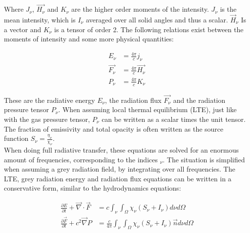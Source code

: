 Where $J_\nu$, $\vec{H_\nu}$ and $K_\nu$ are the higher order moments of the intensity. $J_\nu$ is the mean intensity, which is $I_\nu$ averaged over all solid angles and thus a scalar. $\vec{H}_\nu$ Is a vector and $K_\nu$ is a tensor of order 2. The following relations exist between the moments of intensity and some more physical quantities:

\begin{align}
E_\nu &= \frac{4 \pi}{c} j_\nu \\
\vec{F_\nu} &= \frac{4 \pi}{c} \vec{H_\nu} \\
P_\nu &= \frac{4 \pi}{c} K_\nu
\end{align}

These are the radiative energy $E_\nu$, the radiation flux $\vec{F_\nu}$ and the radiation pressure tensor $P_\nu$. When assuming local thermal equilibrium (LTE), just like with the gas pressure tensor, $P_\nu$ can be written as a scalar times the unit tensor. The fraction of emissivity and total opacity is often written as the source function $S_\nu = \frac{\eta_\nu}{\chi_\nu}$. \\
 When doing full radiative transfer, these equations are solved for an enormous amount of frequencies, corresponding to the indices $_\nu$. The situation is simplified when assuming a grey radiation field, by integrating over all frequencies. The LTE, grey radiation energy and radiation flux equations can be written in a conservative form, similar to the hydrodynamics equations:

\begin{align}
\frac{\partial E}{\partial t} + \vec{\nabla} \cdot \vec{F} &= c \int_\nu \int_\Omega \chi_\nu \left( S_\nu + I_\nu \right) d\nu d\Omega \\
\frac{\partial \vec{F}}{\partial t} + c^2 \vec{\nabla} P &= \frac{c}{4 \pi} \int_\nu \int_\Omega \chi_\nu \left( S_\nu + I_\nu \right) \vec{n} d\nu d\Omega
\end{align}

